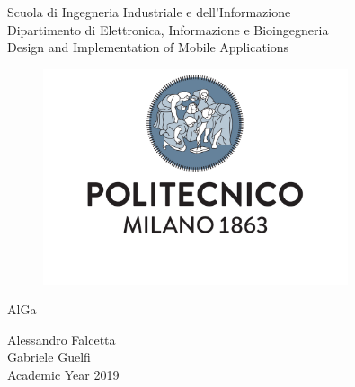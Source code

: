 \begin{titlepage}

\begin{center}
\Large{Scuola di Ingegneria Industriale e dell'Informazione}\\
\Large{Dipartimento di Elettronica, Informazione e Bioingegneria}\\
\vspace{0.3cm}
\large{Design and Implementation of Mobile Applications}
\par
\par
\end{center}


\begin{center}
\begin{figure}[h!]
\centering{}
\includegraphics[width=0.8\textwidth]{Pics/logo_with_write.pdf}
\end{figure}
\vspace{-1cm}
\par
\end{center}

\begin{center}
\Huge{AlGa\\}
\vspace{2.5cm}
\par
\Large{
    Alessandro Falcetta\\
    Gabriele Guelfi\\
}
\vspace{2cm}
{\large{}Academic Year 2019}
\par
\end{center}{\large \par}

\end{titlepage}
